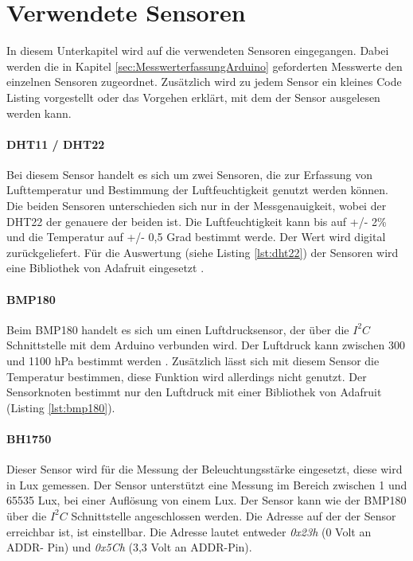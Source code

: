 \section{Verwendete Sensoren}
In diesem Unterkapitel wird auf die verwendeten Sensoren eingegangen. Dabei werden die in Kapitel \ref{sec:MesswerterfassungArduino} geforderten Messwerte den einzelnen Sensoren zugeordnet. Zusätzlich wird zu jedem Sensor ein kleines Code Listing vorgestellt oder das Vorgehen erklärt, mit dem der Sensor ausgelesen werden kann.
\paragraph{DHT11 / DHT22} Bei diesem Sensor handelt es sich um zwei Sensoren, die zur Erfassung von Lufttemperatur und Bestimmung der Luftfeuchtigkeit genutzt werden können. Die beiden Sensoren unterschieden sich nur in der Messgenauigkeit, wobei der DHT22 der genauere der beiden ist. Die Luftfeuchtigkeit kann bis auf +/- 2\% und die Temperatur auf +/- 0,5 Grad bestimmt werde. Der Wert wird digital zurückgeliefert. Für die Auswertung (siehe Listing \ref{lst:dht22}) der Sensoren wird eine Bibliothek von Adafruit eingesetzt \cite{adafruit2016dht}.



\paragraph{BMP180} Beim BMP180 handelt es sich um einen Luftdrucksensor, der über die $I^2C$ Schnittstelle mit dem Arduino verbunden wird. Der Luftdruck kann zwischen 300 und 1100 hPa bestimmt werden \cite{sensortec2013data}. Zusätzlich lässt sich mit diesem Sensor die Temperatur bestimmen, diese Funktion wird allerdings nicht genutzt. Der Sensorknoten bestimmt nur den Luftdruck mit einer Bibliothek von Adafruit (Listing \ref{lst:bmp180}). 


\paragraph{BH1750} Dieser Sensor wird für die Messung der Beleuchtungsstärke eingesetzt, diese wird in Lux gemessen. Der Sensor unterstützt eine Messung im Bereich zwischen 1 und 65535 Lux, bei einer Auflösung von einem Lux. Der Sensor kann wie der BMP180 über die $I^2C$ Schnittstelle angeschlossen werden. Die Adresse auf der der Sensor erreichbar ist, ist einstellbar. Die Adresse lautet entweder \textit{0x23h} (0 Volt an ADDR- Pin) und \textit{0x5Ch} (3,3 Volt an ADDR-Pin). 
